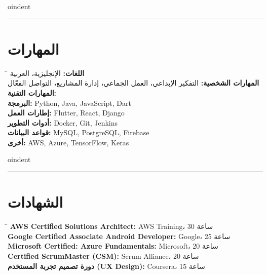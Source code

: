 \documentclass[a4paper,10pt]{article} %
\begin{document}
\begin{RTL}
\vspace{0.3cm}

oindent\rule{\textwidth}{1pt} %
\vspace{0.3cm}

\section*{المهارات}
\vspace{0.5cm} %
\begin{tabbing}
    \hspace{3cm} \= \kill
    \textbf{اللغات:} \> الإنجليزية، العربية \\
    \textbf{المهارات الشخصية:} \> التفكير الإبداعي، العمل الجماعي، إدارة المشاريع، التواصل الفعّال \\
    \textbf{المهارات التقنية:} \+ \\
    \textbf{البرمجة:}  Python, Java, JavaScript, Dart \\
    \textbf{إطارات العمل:}  Flutter, React, Django \\
    \textbf{أدوات التطوير:}  Docker, Git, Jenkins \\
    \textbf{قواعد البيانات:}  MySQL, PostgreSQL, Firebase \\
    \textbf{أخرى:}   AWS, Azure, TensorFlow, Keras \- \\
\end{tabbing}

\vspace{0.3cm}

oindent\rule{\textwidth}{1pt} %
\vspace{0.3cm}

\section*{الشهادات}
\vspace{0.5cm} %
\begin{tabbing}
    \hspace{8cm} \= \kill
    \textbf{AWS Certified Solutions Architect:} \> AWS Training، 30 ساعة \\
    \textbf{Google Certified Associate Android Developer:} \> Google، 25 ساعة \\
    \textbf{Microsoft Certified: Azure Fundamentals:} \> Microsoft، 20 ساعة \\
    \textbf{Certified ScrumMaster (CSM):} \> Scrum Alliance، 20 ساعة \\
    \textbf{دورة تصميم تجربة المستخدم (UX Design):} \> Coursera، 15 ساعة \\
\end{tabbing}


\end{RTL}
\end{document}
